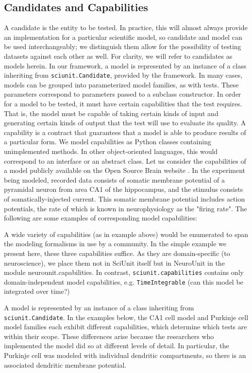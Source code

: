\documentclass[11pt,letterpaper]{article}
\begin{document}
\subsection{Candidates and Capabilities}
A candidate is the entity to be tested.  In practice, this will almost always provide an implementation for a particular scientific model, so candidate and model can be used interchangeably; we distinguish them allow for the possibility of testing datasets against each other as well.  For clarity, we will refer to candidates as models herein.  In our framework, a model is represented by an instance of a class inheriting from \verb|sciunit.Candidate|, provided by the framework.  In many cases, models can be grouped into parameterized model families, as with tests. These parameters correspond to parameters passed to a subclass constructor.
In order for a model to be tested, it must have certain capabilities that the test requires.  That is, the model must be capable of taking certain kinds of input and generating certain kinds of output that the test will use to evaluate its quality.  A capability is a contract that guarantees that a model is able to produce results of a particular form. We model capabilities as Python classes containing unimplemented methods. In other object-oriented languages, this would correspond to an interface or an abstract class.  
Let us consider the capabilities of a model publicly available on the Open Source Brain website \cite{osb_ca1_url}.  In the experiment being modeled, recorded data consists of somatic membrane potential of a pyramidal neuron from area CA1 of the hippocampus, and the stimulus consists of somatically-injected current.  This somatic membrane potential includes action potentials, the rate of which is known in neurophysiology as the "firing rate".  The following are some examples of corresponding model capabilities:  

A wide variety of capabilities (as in example above) would be enumerated to span the modeling formalisms in use by a community. In the simple example we present here, these three capabilities suffice.  As they are domain-specific (to neuroscience), we place them not in SciUnit itself but in NeuroUnit in the module neurounit.capabilities.  In contrast, \verb|sciunit.capabilities| contains only domain-independent model capabilities, e.g. \verb|TimeIntegrable| (can this model be integrated over time?)

A model is represented by an instance of a class inheriting from \verb|sciunit.Candidate|.  In the examples below, the CA1 cell model and Purkinje cell model families each exhibit different capabilities, which determine which tests are within their scope.  These differences arise because the researchers who implemented the model did so at different levels of detail.  In particular, the Purkinje cell was modeled with individual dendritic compartments, so there is an associated dendritic membrane potential. 
\end{document}
